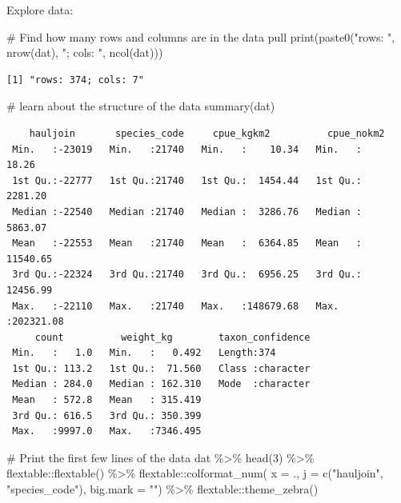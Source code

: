 \documentclass[
  letterpaper,
  oneside,
  open=any]{scrbook}
\newenvironment{Shaded}{\begin{snugshade}}{\end{snugshade}}
\newcommand{\AttributeTok}[1]{\textcolor[rgb]{0.40,0.45,0.13}{#1}}
\newcommand{\CommentTok}[1]{\textcolor[rgb]{0.37,0.37,0.37}{#1}}
\newcommand{\DecValTok}[1]{\textcolor[rgb]{0.68,0.00,0.00}{#1}}
\newcommand{\FunctionTok}[1]{\textcolor[rgb]{0.28,0.35,0.67}{#1}}
\newcommand{\NormalTok}[1]{\textcolor[rgb]{0.00,0.23,0.31}{#1}}
\newcommand{\SpecialCharTok}[1]{\textcolor[rgb]{0.37,0.37,0.37}{#1}}
\newcommand{\StringTok}[1]{\textcolor[rgb]{0.13,0.47,0.30}{#1}}
\begin{document}
Explore data:

\begin{Shaded}
\begin{Highlighting}[]
\CommentTok{\# Find how many rows and columns are in the data pull}
\FunctionTok{print}\NormalTok{(}\FunctionTok{paste0}\NormalTok{(}\StringTok{"rows: "}\NormalTok{, }\FunctionTok{nrow}\NormalTok{(dat), }\StringTok{"; cols: "}\NormalTok{, }\FunctionTok{ncol}\NormalTok{(dat)))}
\end{Highlighting}
\end{Shaded}

\begin{verbatim}
[1] "rows: 374; cols: 7"
\end{verbatim}

\begin{Shaded}
\begin{Highlighting}[]
\CommentTok{\# learn about the structure of the data}
\FunctionTok{summary}\NormalTok{(dat)}
\end{Highlighting}
\end{Shaded}

\begin{verbatim}
    hauljoin       species_code     cpue_kgkm2          cpue_nokm2       
 Min.   :-23019   Min.   :21740   Min.   :    10.34   Min.   :    18.26  
 1st Qu.:-22777   1st Qu.:21740   1st Qu.:  1454.44   1st Qu.:  2281.20  
 Median :-22540   Median :21740   Median :  3286.76   Median :  5863.07  
 Mean   :-22553   Mean   :21740   Mean   :  6364.85   Mean   : 11540.65  
 3rd Qu.:-22324   3rd Qu.:21740   3rd Qu.:  6956.25   3rd Qu.: 12456.99  
 Max.   :-22110   Max.   :21740   Max.   :148679.68   Max.   :202321.08  
     count          weight_kg        taxon_confidence  
 Min.   :   1.0   Min.   :   0.492   Length:374        
 1st Qu.: 113.2   1st Qu.:  71.560   Class :character  
 Median : 284.0   Median : 162.310   Mode  :character  
 Mean   : 572.8   Mean   : 315.419                     
 3rd Qu.: 616.5   3rd Qu.: 350.399                     
 Max.   :9997.0   Max.   :7346.495                     
\end{verbatim}

\begin{Shaded}
\begin{Highlighting}[]
\CommentTok{\# Print the first few lines of the data }
\NormalTok{dat }\SpecialCharTok{\%\textgreater{}\%} 
  \FunctionTok{head}\NormalTok{(}\DecValTok{3}\NormalTok{) }\SpecialCharTok{\%\textgreater{}\%} 
\NormalTok{  flextable}\SpecialCharTok{::}\FunctionTok{flextable}\NormalTok{() }\SpecialCharTok{\%\textgreater{}\%}
\NormalTok{  flextable}\SpecialCharTok{::}\FunctionTok{colformat\_num}\NormalTok{(}
      \AttributeTok{x =}\NormalTok{ ., }
      \AttributeTok{j =} \FunctionTok{c}\NormalTok{(}\StringTok{"hauljoin"}\NormalTok{, }\StringTok{"species\_code"}\NormalTok{), }
      \AttributeTok{big.mark =} \StringTok{""}\NormalTok{) }\SpecialCharTok{\%\textgreater{}\%} 
\NormalTok{  flextable}\SpecialCharTok{::}\FunctionTok{theme\_zebra}\NormalTok{()}
\end{Highlighting}
\end{Shaded}
\end{document}
